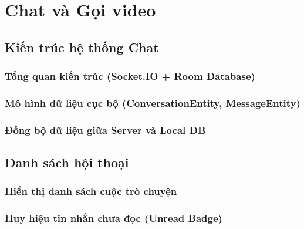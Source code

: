 
\chapter{Chat và Gọi video}

\section{Kiến trúc hệ thống Chat}

\subsection{Tổng quan kiến trúc (Socket.IO + Room Database)}


\subsection{Mô hình dữ liệu cục bộ (ConversationEntity, MessageEntity)}


\subsection{Đồng bộ dữ liệu giữa Server và Local DB}


\section{Danh sách hội thoại}

\subsection{Hiển thị danh sách cuộc trò chuyện}


\subsection{Huy hiệu tin nhắn chưa đọc (Unread Badge)}


